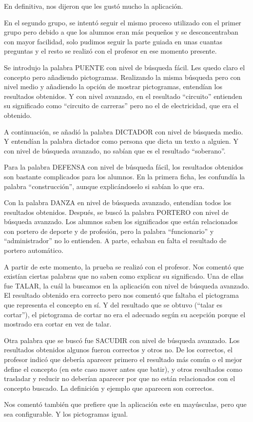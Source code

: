 En definitiva, nos dijeron que les gustó mucho la aplicación.



En el segundo grupo, se intentó seguir el mismo proceso utilizado con el primer grupo pero debido a que los alumnos eran más pequeños y se desconcentraban con mayor facilidad, solo pudimos seguir la parte guiada en unas cuantas preguntas y el resto se realizó con el profesor en ese momento presente.

Se introdujo la palabra PUENTE con nivel de búsqueda fácil. Les quedo claro el concepto pero añadiendo pictogramas.
Realizando la misma búsqueda pero con nivel medio y añadiendo la opción de mostrar pictogramas, entendían los resultados obtenidos.
Y con nivel avanzado, en el resultado ``circuito'' entienden su significado como ``circuito de carreras'' pero no el de electricidad, que era el obtenido.

A continuación, se añadió la palabra DICTADOR con nivel de búsqueda medio. Y entendían la palabra dictador como persona que dicta un texto a alguien. Y con nivel de búsqueda avanzado, no sabían que es el resultado ``soberano''.

Para la palabra DEFENSA con nivel de búsqueda fácil, los resultados obtenidos son bastante complicados para los alumnos. En la primera ficha, les confundía la palabra ``construcción'', aunque explicándoselo si sabían lo que era.

Con la palabra DANZA en nivel de búsqueda avanzado, entendían todos los resultados obtenidos.
Después, se buscó la palabra PORTERO con nivel de búsqueda avanzado. Los alumnos saben los significados que están relacionados con portero de deporte y de profesión, pero la palabra ``funcionario'' y ``administrador'' no lo entienden. A parte, echaban en falta el resultado de portero automático.

A partir de este momento, la prueba se realizó con el profesor. Nos comentó que existían ciertas palabras que no saben como explicar su significado.
Una de ellas fue TALAR, la cuál la buscamos en la aplicación con nivel de búsqueda avanzado. El resultado obtenido era correcto pero nos comentó que faltaba el pictograma que representa el concepto en sí. Y del resultado que se obtuvo (``talar es cortar''), el pictograma de cortar no era el adecuado según su acepción porque el mostrado era cortar en vez de talar.

Otra palabra que se buscó fue SACUDIR con nivel de búsqueda avanzado. Los resultados obtenidos algunos fueron correctos y otros no. De los correctos, el profesor indicó que debería aparecer primero el resultado más común o el mejor define el concepto (en este caso mover antes que batir), y otros resultados como trasladar y reducir no deberían aparecer por que no están relacionados con el concepto buscado.
La definición y ejemplo que aparecen son correctos. 

Nos comentó también que prefiere que la aplicación este en mayúsculas, pero que sea configurable. Y los pictogramas igual.


